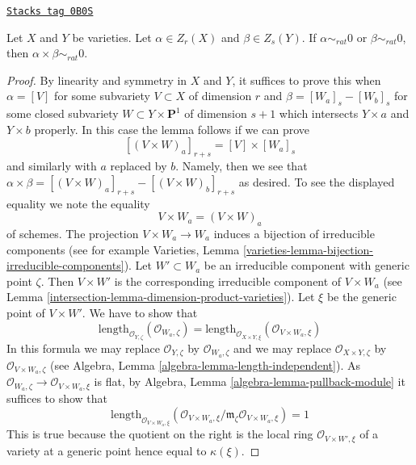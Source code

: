 \begin{lemma}
\label{intersection-lemma-exterior-product-rational-equivalence}
\href{https://stacks.math.columbia.edu/tag/0B0S}{\texttt{Stacks tag 0B0S}}

Let $X$ and $Y$ be varieties.
Let $\alpha \in Z_r(X)$ and $\beta \in Z_s(Y)$.
If $\alpha \sim_{rat} 0$ or $\beta \sim_{rat} 0$, then
$\alpha \times \beta \sim_{rat} 0$.
\end{lemma}

\begin{proof}

By linearity and symmetry in $X$ and $Y$, it suffices to prove this when
$\alpha = [V]$ for some subvariety $V \subset X$ of dimension $r$ and
$\beta = [W_a]_s - [W_b]_s$ for some closed subvariety
$W \subset Y \times \mathbf{P}^1$ of dimension $s + 1$ which
intersects $Y \times a$ and $Y \times b$ properly. In this case
the lemma follows if we can prove
$$
[(V \times W)_a]_{r + s} = [V] \times [W_a]_s
$$
and similarly with $a$ replaced by $b$. Namely, then we see that
$\alpha \times \beta = [(V \times W)_a]_{r + s} - [(V \times W)_b]_{r + s}$
as desired. To see the displayed equality we note the equality
$$
V \times W_a = (V \times W)_a
$$
of schemes. The projection $V \times W_a \to W_a$ induces a bijection
of irreducible components (see for example
Varieties, Lemma \ref{varieties-lemma-bijection-irreducible-components}).
Let $W' \subset W_a$ be an irreducible component with generic point $\zeta$.
Then $V \times W'$ is the corresponding irreducible component of
$V \times W_a$ (see Lemma \ref{intersection-lemma-dimension-product-varieties}).
Let $\xi$ be the generic point of $V \times W'$. We have to show that
$$
\text{length}_{\mathcal{O}_{Y, \zeta}}(\mathcal{O}_{W_a, \zeta}) =
\text{length}_{\mathcal{O}_{X \times Y, \xi}}(
\mathcal{O}_{V \times W_a, \xi})
$$
In this formula we may replace
$\mathcal{O}_{Y, \zeta}$ by $\mathcal{O}_{W_a, \zeta}$ and
we may replace
$\mathcal{O}_{X \times Y, \zeta}$ by $\mathcal{O}_{V \times W_a, \zeta}$
(see Algebra, Lemma \ref{algebra-lemma-length-independent}).
As $\mathcal{O}_{W_a, \zeta} \to \mathcal{O}_{V \times W_a, \xi}$ is flat,
by Algebra, Lemma \ref{algebra-lemma-pullback-module} it suffices
to show that
$$
\text{length}_{\mathcal{O}_{V \times W_a, \xi}}(
\mathcal{O}_{V \times W_a, \xi}/
\mathfrak m_\zeta\mathcal{O}_{V \times W_a, \xi}) = 1
$$
This is true because the quotient on the right is the local ring
$\mathcal{O}_{V \times W', \xi}$ of a variety at a generic point
hence equal to $\kappa(\xi)$.
\end{proof}

